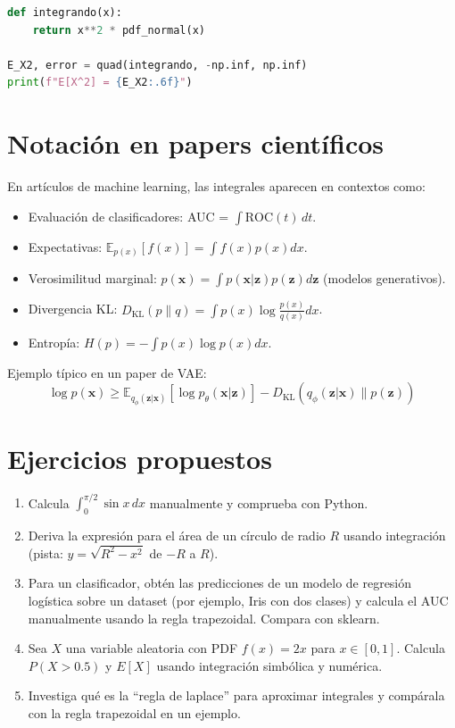 \documentclass[12pt,a4paper,openany,oneside]{book}
\begin{document}
\begin{lstlisting}[language=Python]
def integrando(x):
    return x**2 * pdf_normal(x)

E_X2, error = quad(integrando, -np.inf, np.inf)
print(f"E[X^2] = {E_X2:.6f}")
\end{lstlisting}

\section{Notación en papers científicos}

En artículos de machine learning, las integrales aparecen en contextos como:

\begin{itemize}
    \item Evaluación de clasificadores: AUC = $\int \text{ROC}(t) \, dt$.
    \item Expectativas: $\mathbb{E}_{p(x)}[f(x)] = \int f(x) p(x) dx$.
    \item Verosimilitud marginal: $p(\mathbf{x}) = \int p(\mathbf{x}|\mathbf{z}) p(\mathbf{z}) d\mathbf{z}$ (modelos generativos).
    \item Divergencia KL: $D_{\text{KL}}(p\|q) = \int p(x) \log\frac{p(x)}{q(x)} dx$.
    \item Entropía: $H(p) = -\int p(x) \log p(x) dx$.
\end{itemize}

Ejemplo típico en un paper de VAE:
\[
\log p(\mathbf{x}) \ge \mathbb{E}_{q_\phi(\mathbf{z}|\mathbf{x})} [\log p_\theta(\mathbf{x}|\mathbf{z})] - D_{\text{KL}}(q_\phi(\mathbf{z}|\mathbf{x}) \| p(\mathbf{z}))
\]

\section{Ejercicios propuestos}

\begin{enumerate}
    \item Calcula $\int_0^{\pi/2} \sin x \, dx$ manualmente y comprueba con Python.
    \item Deriva la expresión para el área de un círculo de radio $R$ usando integración (pista: $y = \sqrt{R^2 - x^2}$ de $-R$ a $R$).
    \item Para un clasificador, obtén las predicciones de un modelo de regresión logística sobre un dataset (por ejemplo, Iris con dos clases) y calcula el AUC manualmente usando la regla trapezoidal. Compara con sklearn.
    \item Sea $X$ una variable aleatoria con PDF $f(x) = 2x$ para $x \in [0,1]$. Calcula $P(X > 0.5)$ y $E[X]$ usando integración simbólica y numérica.
    \item Investiga qué es la ``regla de laplace'' para aproximar integrales y compárala con la regla trapezoidal en un ejemplo.
\end{enumerate}
\end{document}
